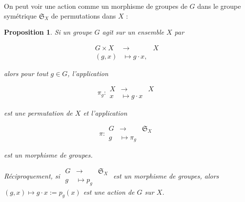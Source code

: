\documentclass[french]{book}
\newtheorem{prop}{Proposition}[section]
\begin{document}
On peut voir une action comme un morphisme de groupes de $G$ dans le groupe symétrique $\mathfrak{S}_{X} $ de permutations dans $X$ :

\begin{prop}
  Si un groupe $G$ agit sur un ensemble $X$ par

  \[
    \begin{array}{rcl}
    G \times X & \longrightarrow & X \\
    (g,x) & \longmapsto g \cdot x,
    \end{array}
  \]

  alors pour tout $g \in G$, l'application

  \[
  \pi_g:
    \begin{array}{rcl}
    X & \longrightarrow & X \\
    x & \longmapsto g \cdot x
    \end{array}
  \]

  est une permutation de $X$ et l'application

  \[
  \pi:
    \begin{array}{rcl}
    G & \longrightarrow & \mathfrak{S}_{X}  \\
    g & \longmapsto \pi_g
    \end{array}
  \]

  est un morphisme de groupes.

  Réciproquement, si $
    \begin{array}{rcl}
    G & \longrightarrow & \mathfrak{S}_{X}  \\
    g & \longmapsto p_g
    \end{array}$ est un morphisme de groupes, alors $(g,x) \mapsto g \cdot x :=p_g(x)$ est une action de $G$ sur $X$.
\end{prop}
\end{document}
